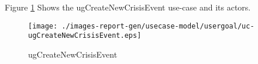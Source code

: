 Figure \ref{fig:lu.uni.lassy.excalibur.group09.spec-RE-UCD-uc-ugCreateNewCrisisEvent}
Shows the ugCreateNewCrisisEvent use-case and its actors.

\begin{figure}[htbp]
\begin{center}

\texttt{[image: ./images-report-gen/usecase-model/usergoal/uc-ugCreateNewCrisisEvent.eps]}
\end{center}
\caption[lu.uni.lassy.excalibur.group09.spec Use Case Diagram: uc-ugCreateNewCrisisEvent]{ugCreateNewCrisisEvent}
\label{fig:lu.uni.lassy.excalibur.group09.spec-RE-UCD-uc-ugCreateNewCrisisEvent}
\end{figure}
\vspace{0.5cm}
